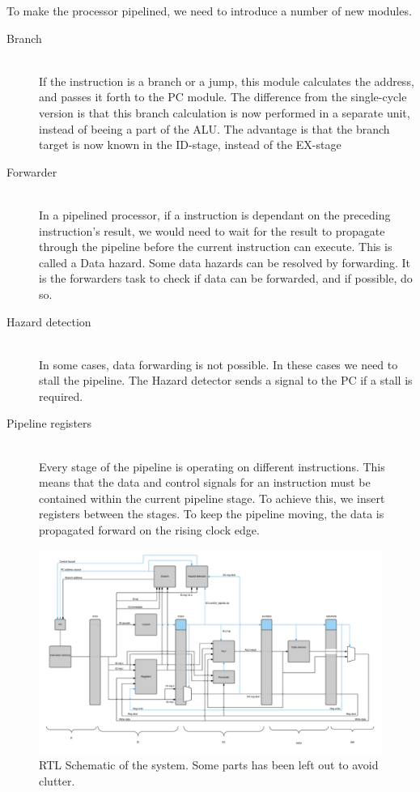 To make the processor pipelined, we need to introduce a number of new modules.

\begin{description}
  \item[Branch] \hfill \\
  If the instruction is a branch or a jump, this module calculates the address, and passes it forth to the PC module. The difference from the single-cycle version is that this  branch calculation is now performed in a separate unit, instead of beeing a part of the ALU. The advantage is that the branch target is now known in the ID-stage, instead of the EX-stage 
  \item[Forwarder] \hfill \\
  In a pipelined processor, if a instruction is dependant on the preceding instruction's result, we would need to wait for the result to propagate through the pipeline before the current instruction can execute. This is called a Data hazard. Some data hazards can be resolved by forwarding. It is the forwarders task to check if data can be forwarded, and if possible, do so.
  \item[Hazard detection] \hfill \\
  In some cases, data forwarding is not possible. In these cases we need to stall the pipeline. The Hazard detector sends a signal to the PC if a stall is required.
  \item[Pipeline registers] \hfill \\
  Every stage of the pipeline is operating on different instructions. This means that the data and control signals for an instruction must be contained within the current pipeline stage. To achieve this, we insert registers between the stages. To keep the pipeline moving, the data is propagated forward on the rising clock edge. 
\end{description}

\begin{figure}[h!]
    \includegraphics[width=\linewidth]{img/toplel.png}
    \caption{RTL Schematic of the system. Some parts has been left out to avoid clutter.}
    \label{fig:toplevel}
\end{figure}



